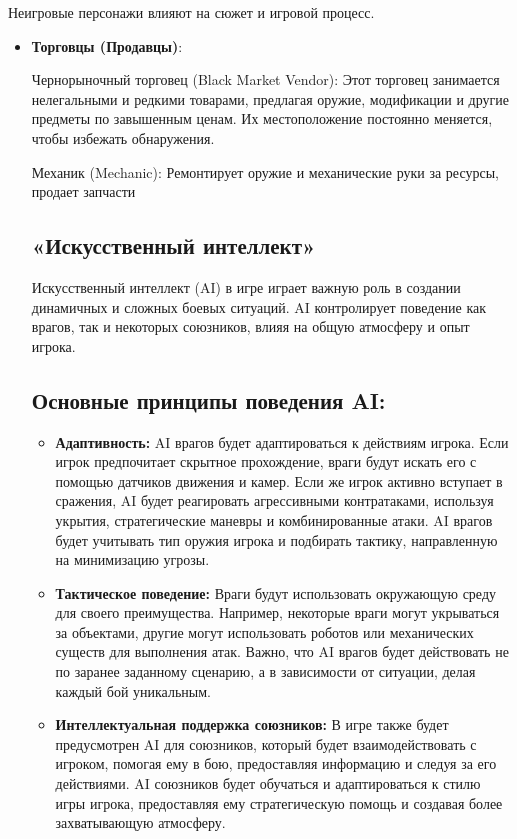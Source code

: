 \documentclass{article}
\begin{document}
Неигровые персонажи влияют на сюжет и игровой процесс.

\begin{itemize} 
    \item \textbf{Торговцы (Продавцы)}: 
    
    Чернорыночный торговец (Black Market Vendor): Этот торговец занимается нелегальными и редкими товарами, предлагая оружие, модификации и другие предметы по завышенным ценам. Их местоположение постоянно меняется, чтобы избежать обнаружения. 

    Механик (Mechanic): Ремонтирует оружие и механические руки за ресурсы, продает запчасти

\subsection{«Искусственный интеллект»}
Искусственный интеллект (AI) в игре играет важную роль в создании динамичных и сложных боевых ситуаций. AI контролирует поведение как врагов, так и некоторых союзников, влияя на общую атмосферу и опыт игрока.
\subsection{Основные принципы поведения AI:}

\begin{itemize}
    \item \textbf{Адаптивность:} AI врагов будет адаптироваться к действиям игрока. Если игрок предпочитает скрытное прохождение, враги будут искать его с помощью датчиков движения и камер. Если же игрок активно вступает в сражения, AI будет реагировать агрессивными контратаками, используя укрытия, стратегические маневры и комбинированные атаки. AI врагов будет учитывать тип оружия игрока и подбирать тактику, направленную на минимизацию угрозы.
    
    \item \textbf{Тактическое поведение:} Враги будут использовать окружающую среду для своего преимущества. Например, некоторые враги могут укрываться за объектами, другие могут использовать роботов или механических существ для выполнения атак. Важно, что AI врагов будет действовать не по заранее заданному сценарию, а в зависимости от ситуации, делая каждый бой уникальным.
    
    \item \textbf{Интеллектуальная поддержка союзников:} В игре также будет предусмотрен AI для союзников, который будет взаимодействовать с игроком, помогая ему в бою, предоставляя информацию и следуя за его действиями. AI союзников будет обучаться и адаптироваться к стилю игры игрока, предоставляя ему стратегическую помощь и создавая более захватывающую атмосферу.
\end{itemize}


\end{itemize}
\end{document}
